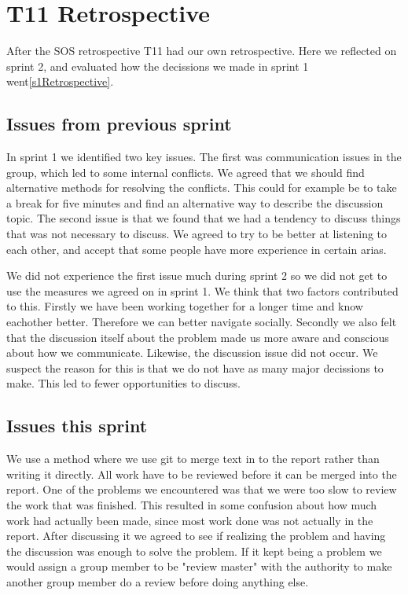 \section{T11 Retrospective} \label{s2Retrospective}

After the SOS retrospective \gls{T11} had our own retrospective. Here we reflected on sprint 2, and evaluated how the decissions we made in sprint 1 went\autoref{s1Retrospective}.

\subsection{Issues from previous sprint}

In sprint 1 we identified two key issues. The first was communication issues in the group, which led to some internal conflicts. We agreed that we should find alternative methods for resolving the conflicts. This could for example be to take a break for five minutes and find an alternative way to describe the discussion topic. The second issue is that we found that we had a tendency to discuss things that was not necessary to discuss. We agreed to try to be better at listening to each other, and accept that some people have more experience in certain arias. 

We did not experience the first issue much during sprint 2 so we did not get to use the measures we agreed on in sprint 1. We think that two factors contributed to this. Firstly we have been working together for a longer time and know eachother better. Therefore we can better navigate socially. Secondly we also felt that the discussion itself about the problem made us more aware and conscious about how we communicate.
Likewise, the discussion issue did not occur. We suspect the reason for this is that we do not have as many major decissions to make. This led to fewer opportunities to discuss.

\subsection{Issues this sprint}
We use a method where we use git to merge text in to the report rather than writing it directly. All work have to be reviewed before it can be merged into the report. One of the problems we encountered was that we were too slow to review the work that was finished. This resulted in some confusion about how much work had actually been made, since most work done was not actually in the report. After discussing it we agreed to see if realizing the problem and having the discussion was enough to solve the problem. If it kept being a problem we would assign a group member to be "review master" with the authority to make another group member do a review before doing anything else. 

